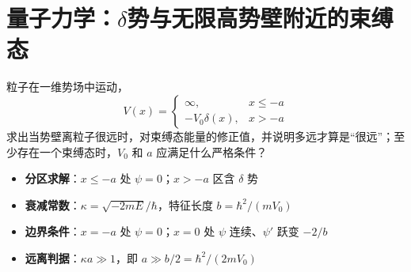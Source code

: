 \section{量子力学：$\delta$势与无限高势壁附近的束缚态}
\label{sec:delta-wall-bound-state}

\begin{modelbox}
粒子在一维势场中运动，
\[
V(x)=\begin{cases}\infty,&x\leq-a\\-V_0\delta(x),&x>-a\end{cases}
\]
求出当势壁离粒子很远时，对束缚态能量的修正值，并说明多远才算是``很远''；至少存在一个束缚态时，$V_0$ 和 $a$ 应满足什么严格条件？
\end{modelbox}

\begin{tipbox}[考点快速分析]
\begin{itemize}
    \item \textbf{分区求解}：$x\leq-a$ 处 $\psi=0$；$x>-a$ 区含 $\delta$ 势
    \item \textbf{衰减常数}：$\kappa=\sqrt{-2mE}/\hbar$，特征长度 $b=\hbar^2/(mV_0)$
    \item \textbf{边界条件}：$x=-a$ 处 $\psi=0$；$x=0$ 处 $\psi$ 连续、$\psi'$ 跃变 $-2/b$
    \item \textbf{远离判据}：$\kappa a\gg1$，即 $a\gg b/2=\hbar^2/(2mV_0)$
\end{itemize}
\end{tipbox}

